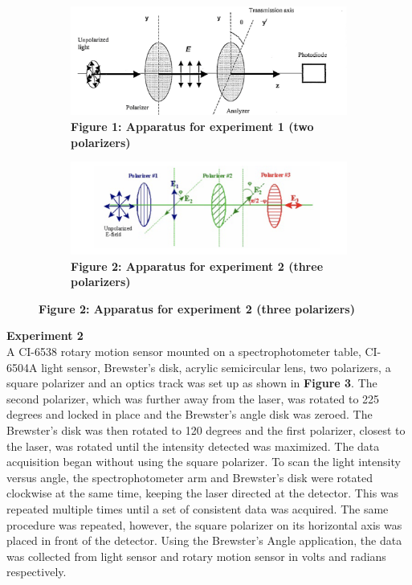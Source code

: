 \documentclass[
	letterpaper, %
	10pt, %
]{CSUniSchoolLabReport}
\begin{document}
\begin{figure}[H]
	\begin{subfigure}{0.45\textwidth}
		\includegraphics[width=\textwidth]{../figures/experimentOneApparatusA.png}
		\caption{\textbf{Figure 1: Apparatus for experiment 1 (two polarizers)}}
	\end{subfigure}\hfill
	\begin{subfigure}{0.45\textwidth}
		\includegraphics[width=\textwidth]{../figures/experimentOneApparatusB.png}
		\caption{\textbf{Figure 2: Apparatus for experiment 2 (three polarizers)}}
	\end{subfigure}
\end{figure}
\newpage
\textbf{Experiment 2}\\
A CI-6538 rotary motion sensor mounted on a spectrophotometer table, CI-6504A light sensor, Brewster's disk,
acrylic semicircular lens, two polarizers, a square polarizer and an optics track was set up as shown in \textbf{Figure 3}.
The second polarizer, which was further away from the laser, was rotated to 225 degrees and locked in place and the
Brewster's angle disk was zeroed. The Brewster's disk was then rotated to 120 degrees and the first polarizer,
closest to the laser, was rotated until the intensity detected was maximized. The data acquisition began without
using the square polarizer. To scan the light intensity versus angle, the spectrophotometer arm and Brewster's
disk were rotated clockwise at the same time, keeping the laser directed at the detector. This was repeated
multiple times until a set of consistent data was acquired. The same procedure was repeated, however, the
square polarizer on its horizontal axis was placed in front of the detector. Using the Brewster's Angle
application, the data was collected from light sensor and rotary motion sensor in volts and radians respectively.
\end{document}
